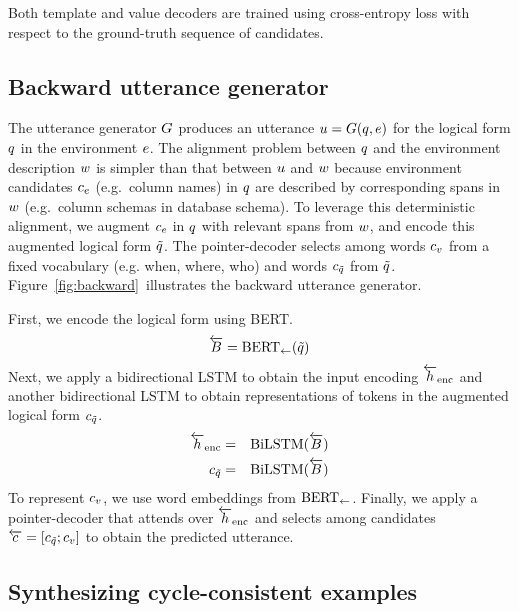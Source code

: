 \documentclass[11pt,a4paper]{article}
\begin{document}
Both template and value decoders are trained using cross-entropy loss with respect to the ground-truth sequence of candidates.





\subsection{Backward utterance generator}
\label{sec:generator}

The utterance generator ${G}$ produces an utterance ${u} = {G}({q}, {e})$ for the logical form ${q}$ in the environment ${e}$.
The alignment problem between ${q}$ and the environment description ${w}$ is simpler than that between ${u}$ and ${w}$ because environment candidates ${c}_{e}$ (e.g.~column names) in ${q}$ are described by corresponding spans in ${w}$ (e.g.~column schemas in database schema).
To leverage this deterministic alignment, we augment ${c}_{e}$ in ${q}$ with relevant spans from ${w}$, and encode this augmented logical form ${\tilde{{q}}}$.
The pointer-decoder selects among words ${c}_{v}$ from a fixed vocabulary (e.g. when, where, who) and words ${c}_{\tilde{{q}}}$ from ${\tilde{{q}}}$.
Figure~\ref{fig:backward}~illustrates the backward utterance generator.




First, we encode the logical form using BERT.
\begin{eqnarray}
{\overleftarrow{{B}}} = {{\rm BERT}_{\leftarrow}}({\tilde{{q}}})
\end{eqnarray}
Next, we apply a bidirectional LSTM to obtain the input encoding ${\overleftarrow{{h}}}_{\rm enc}$ and another bidirectional LSTM to obtain representations of tokens in the augmented logical form ${c}_{\tilde{{q}}}$.
\begin{eqnarray}
{\overleftarrow{{h}}}_{\rm enc} &=& {{\rm BiLSTM}}({\overleftarrow{{B}}})\\
{c}_{\tilde{{q}}} &=& {{\rm BiLSTM}}({\overleftarrow{{B}}})
\end{eqnarray}
To represent ${c}_{v}$, we use word embeddings from ${{\rm BERT}_{\leftarrow}}$.
Finally, we apply a pointer-decoder that attends over ${\overleftarrow{{h}}}_{\rm enc}$ and selects among candidates ${{\overleftarrow{c}}} = {[{c}_{\tilde{{q}}} ; {c}_{v}]}$ to obtain the predicted utterance.


\subsection{Synthesizing cycle-consistent examples}
\label{sec:cycle}
\end{document}
